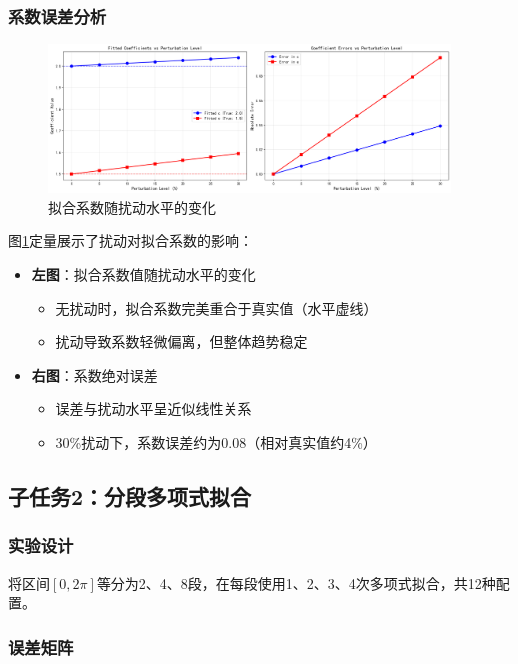 \documentclass[a4paper,12pt]{article}
\theoremstyle{definition}
\begin{document}
\subsubsection{系数误差分析}

\begin{figure}[H]
\centering
\includegraphics[width=0.95\textwidth]{results/task2/additional/coefficient_analysis.png}
\caption{拟合系数随扰动水平的变化}
\label{fig:task2_coeff}
\end{figure}

图\ref{fig:task2_coeff}定量展示了扰动对拟合系数的影响：
\begin{itemize}
    \item \textbf{左图}：拟合系数值随扰动水平的变化
    \begin{itemize}
        \item 无扰动时，拟合系数完美重合于真实值（水平虚线）
        \item 扰动导致系数轻微偏离，但整体趋势稳定
    \end{itemize}
    \item \textbf{右图}：系数绝对误差
    \begin{itemize}
        \item 误差与扰动水平呈近似线性关系
        \item 30\%扰动下，系数误差约为0.08（相对真实值约4\%）
    \end{itemize}
\end{itemize}

\subsection{子任务2：分段多项式拟合}

\subsubsection{实验设计}

将区间$[0, 2\pi]$等分为2、4、8段，在每段使用1、2、3、4次多项式拟合，共12种配置。

\subsubsection{误差矩阵}
\end{document}
